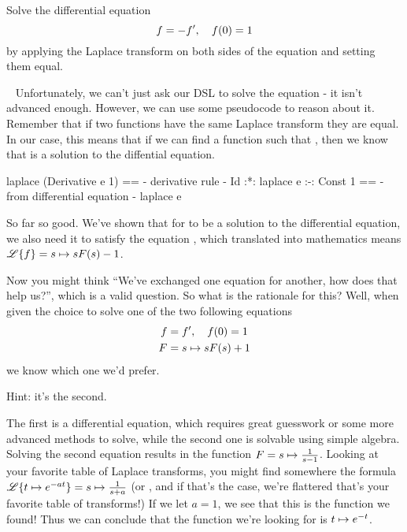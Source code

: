 \begin{example}
  Solve the differential equation
  \begin{equation*}
   f = -f' \qc f(0) = 1
 \end{equation*}
 by applying the Laplace transform on both sides of the equation and setting
 them equal.
\end{example}
\begin{solution}
~
Unfortunately, we can't just ask our DSL to solve the equation - it isn't
advanced enough. However, we can use some pseudocode to reason about it.
Remember that if two functions have the same Laplace transform they are equal.
In our case, this means that if we can find a function such that
, then we know that  is a
solution to the diffential equation. 
\begin{code}
  laplace (Derivative e 1)
== {- derivative rule -}
  Id :*: laplace e :-: Const 1
== {- from differential equation -}
  laplace e
\end{code} 
So far so good. We've shown that for  to be a solution to the
differential equation, we also need it to satisfy the equation , which translated into mathematics means
$\mathscr{L}\{f\} = s \mapsto s F(s) - 1$.

Now you might think ``We've exchanged one
equation for another, how does that help us?'', which is a valid question. So
what is the rationale for this? Well, when given the choice to solve one of the
two following equations
\begin{align*}
  f &= f' \qc f(0) = 1 \\
  F &= \fcn{s}{s F(s) + 1}
\end{align*}
we know which one we'd prefer.

Hint: it's the second.

The first is a differential equation, which 
requires great guesswork or some more advanced methods to solve, while the second one is
solvable using simple algebra.
Solving the second equation results in the function $F =
s \mapsto \frac{1}{s-1}$. Looking at your favorite table of Laplace transforms,
you might find somewhere the formula $\mathscr{L}\{t \mapsto e^{-at}\} =
s \mapsto \frac{1}{s+a}$ (or  ,
 and if that's the case, we're flattered that's your
  favorite table of transforms!)  If we
  let $a = 1$, we see that this is the function we found!
  Thus we can conclude that the function we're looking for is
  $t \mapsto e^{-t}$.


\end{solution}
